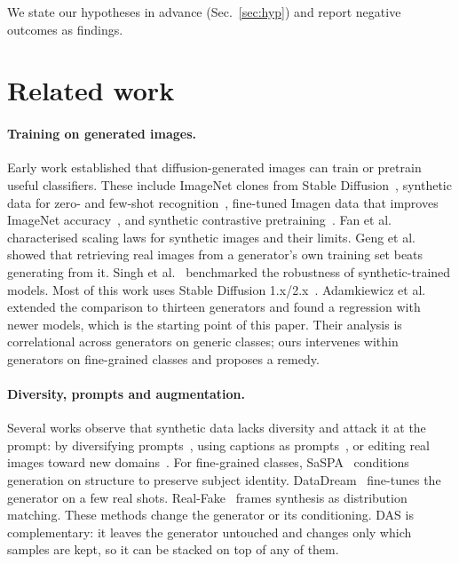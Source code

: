 \documentclass[10pt,twocolumn,letterpaper]{article}
\begin{document}
We state our hypotheses in advance (Sec.~\ref{sec:hyp}) and report negative outcomes as findings.

\section{Related work}
\paragraph{Training on generated images.} Early work established that diffusion-generated images can train or pretrain useful classifiers. These include ImageNet clones from Stable Diffusion~\cite{sariyildiz2023fake}, synthetic data for zero- and few-shot recognition~\cite{he2023synthetic}, fine-tuned Imagen data that improves ImageNet accuracy~\cite{azizi2023synthetic}, and synthetic contrastive pretraining~\cite{tian2023stablerep,tian2024learning}. Fan et al.~\cite{fan2024scaling} characterised scaling laws for synthetic images and their limits. Geng et al.~\cite{geng2024unmet} showed that retrieving real images from a generator's own training set beats generating from it. Singh et al.~\cite{singh2024synthetic} benchmarked the robustness of synthetic-trained models. Most of this work uses Stable Diffusion 1.x/2.x~\cite{rombach2022high}. Adamkiewicz et al.~\cite{adamkiewicz2026pretty} extended the comparison to thirteen generators and found a regression with newer models, which is the starting point of this paper. Their analysis is correlational across generators on generic classes; ours intervenes within generators on fine-grained classes and proposes a remedy.

\paragraph{Diversity, prompts and augmentation.} Several works observe that synthetic data lacks diversity and attack it at the prompt: by diversifying prompts~\cite{shipard2023diversity}, using captions as prompts~\cite{lei2023image}, or editing real images toward new domains~\cite{dunlap2023diversify,trabucco2024effective}. For fine-grained classes, SaSPA~\cite{michaeli2024advancing} conditions generation on structure to preserve subject identity. DataDream~\cite{kim2024datadream} fine-tunes the generator on a few real shots. Real-Fake~\cite{yuan2024realfake} frames synthesis as distribution matching. These methods change the generator or its conditioning. DAS is complementary: it leaves the generator untouched and changes only which samples are kept, so it can be stacked on top of any of them.
\end{document}
